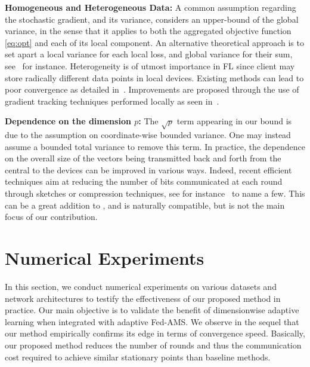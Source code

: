 \documentclass[11pt]{article}
\begin{document}
\textbf{Homogeneous and Heterogeneous Data:} A common assumption regarding the stochastic gradient, and its variance, considers an upper-bound of the global variance, in the sense that it applies to both the aggregated objective function \eqref{eq:opt} and each of its local component. 
An alternative theoretical approach is to set apart a local variance for each local loss, and global variance for their sum, see~\citep{chen2020toward} for instance.
Heterogeneity is of utmost importance in FL since client may store radically different data points in local devices.
Existing methods can lead to poor convergence as detailed in~\citep{li2019federated,liang2019variance}. 
Improvements are proposed through the use of gradient tracking techniques performed locally as seen in~\citep{haddadpour2020federated,horvath2019stochastic,karimireddy2019scaffold}.


\textbf{Dependence on the dimension $p$:} The $\sqrt p$ term appearing in our bound is due to the assumption on coordinate-wise bounded variance. One may instead assume a bounded total variance to remove this term. 
In practice, the dependence on the overall size of the vectors being transmitted back and forth from the central to the devices can be improved in various ways. Indeed, recent efficient techniques aim at reducing the number of bits communicated at each round through sketches or compression techniques, see for instance~\citep{haddadpour2020fedsketch,ivkin2019communication,li2019privacy} to name a few.
This can be a great addition to \algo, and is naturally compatible, but is not the main focus of our contribution.





\section{Numerical Experiments}\label{sec:numerical}

In this section, we conduct numerical experiments on various datasets and network architectures to testify the effectiveness of our proposed method in practice. Our main objective is to validate the benefit of dimensionwise adaptive learning when integrated with adaptive Fed-AMS.
We observe in the sequel that our method empirically confirms its edge in terms of convergence speed.
Basically, our proposed method reduces the number of rounds and thus the communication cost required to achieve similar stationary points than baseline methods. 
\end{document}
